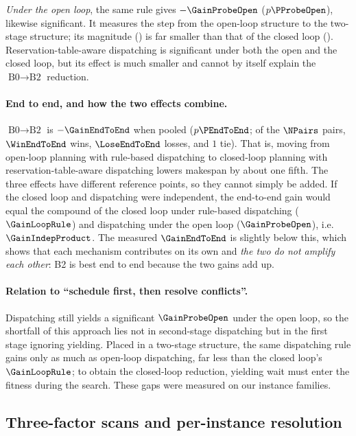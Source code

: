 \emph{Under the open loop}, the same rule gives $-\GainProbeOpen$ ($p\PProbeOpen$), likewise significant.
It measures the step from the open-loop structure to the two-stage structure;
its magnitude (\GainProbeOpen{}) is far smaller than that of the closed loop (\GainLoopRule{}).
Reservation-table-aware dispatching is significant under both the open and the closed loop, but its effect is much smaller and cannot by itself explain the $\text{B0}\to\text{B2}$ reduction.

\paragraph{End to end, and how the two effects combine.}
\label{sec:complement}
$\text{B0}\to\text{B2}$ is $-\GainEndToEnd$ when pooled
($p\PEndToEnd$; of the $\NPairs$ pairs, $\WinEndToEnd$ wins, $\LoseEndToEnd$ losses, and $1$ tie).
That is, moving from open-loop planning with rule-based dispatching to closed-loop planning with reservation-table-aware dispatching lowers makespan by about one fifth. The three effects have different reference points, so they cannot simply be added.
If the closed loop and dispatching were independent, the end-to-end gain would equal the compound of the closed loop under rule-based dispatching ($\GainLoopRule$) and dispatching under the open loop ($\GainProbeOpen$), i.e.\ $\GainIndepProduct$. The measured $\GainEndToEnd$ is slightly below this, which shows that each mechanism contributes on its own and \emph{the two do not amplify each other}: B2 is best end to end because the two gains add up.

\paragraph{Relation to ``schedule first, then resolve conflicts''.}
Dispatching still yields a significant $\GainProbeOpen$ under the open loop, so the shortfall of this approach lies not in second-stage dispatching but in the first stage ignoring yielding. Placed in a two-stage structure, the same dispatching rule gains only as much as open-loop dispatching, far less than the closed loop's $\GainLoopRule$; to obtain the closed-loop reduction, yielding wait must enter the fitness during the search. These gaps were measured on our instance families.

\subsection{Three-factor scans and per-instance resolution}
\label{sec:whichcongestion}

